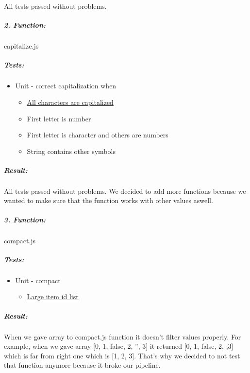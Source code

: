 \documentclass[a4paper, 12pt]{article}
\begin{document}
		All tests passed without problems.
		
		
		
		\hypertarget{header-n50}{%
		\subparagraph{2. Function:}\label{header-n50}}
		
		capitalize.js
		
		\hypertarget{header-n52}{%
		\subparagraph{Tests:}\label{header-n52}}
		
		\begin{itemize}
		\item
		Unit - correct capitalization when
		
		\begin{itemize}
			\item
			\underline{All characters are capitalized}
			\item
			First letter is number
			\item
			First letter is character and others are numbers
			\item
			String contains other symbols
		\end{itemize}
		\end{itemize}
		
		\hypertarget{header-n70}{%
		\subparagraph{\texorpdfstring{Result: }{Result: }}\label{header-n70}}
		
		All tests passed without problems. We decided to add more functions
		because we wanted to make sure that the function works with other values
		aswell.
		
\newpage
		
		\hypertarget{header-n378}{%
		\subparagraph{3. Function:}\label{header-n378}}
		
		compact.js
		
		\hypertarget{header-n380}{%
		\subparagraph{Tests:}\label{header-n380}}
		
		\begin{itemize}
		\item
		Unit - compact
		
		\begin{itemize}
			\item
			\underline{Large item id list}
		\end{itemize}
		\end{itemize}
		
		\hypertarget{header-n393}{%
		\subparagraph{\texorpdfstring{Result: }{Result: }}\label{header-n393}}
		
		When we gave array to compact.js function it doesn't filter values
		properly. For example, when we gave array {[}0, 1, false, 2, '', 3{]} it
		returned {[}0, 1, false, 2, ,3{]} which is far from right one which is
		{[}1, 2, 3{]}. That's why we decided to not test that function anymore
		because it broke our pipeline.
		
\end{document}
